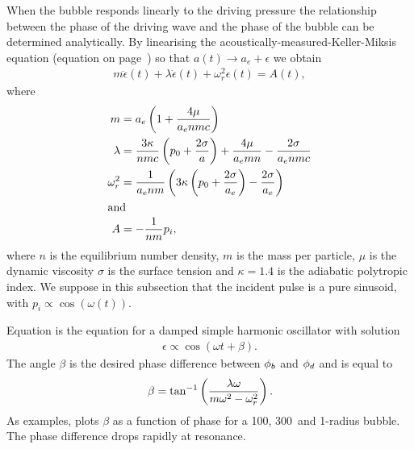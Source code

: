 When the bubble responds linearly to the driving pressure 
the relationship between the phase of the driving wave and the phase of the bubble can be determined analytically.
By linearising the acoustically-measured-Keller-Miksis equation (equation  on page~\pageref{eqn:RKM})
so that $a(t) \rightarrow a_e + \epsilon$
we obtain
\begin{align}
 m \ddot \epsilon(t) + \lambda \dot \epsilon(t) + \omega_r^2 \epsilon(t) = A(t), \label{eqn:SHO}
\end{align}
where 
\begin{align}
  m &= a_e\left( 1+ \frac{4\mu}{a_enmc} \right)\\
  \lambda &= \frac{3\kappa}{nmc}\left( p_0+\frac{2\sigma}{a} \right) + \frac{4\mu}{a_emn} - \frac{2\sigma}{a_e nmc}\\
  \omega_r^2 &= \frac{1}{a_enm}\left( 3\kappa \left( p_0 +\frac{2\sigma}{a_e} \right) - \frac{2\sigma}{a_e} \right)\label{eqn:omegar}\\
\intertext{and}
  A &=- \frac{1}{nm}{p_i},
\end{align}
where $n$ is the equilibrium number density, $m$ is the mass per particle, $\mu$ is the dynamic viscosity $\sigma$ is the surface tension and 
 $\kappa= 1.4$ is the adiabatic polytropic index.
We suppose in this subsection that the incident pulse is a pure sinusoid, with  $p_i \propto \cos(\omega(t))$.

Equation  is the equation for a damped simple harmonic oscillator with solution
\begin{align}
\epsilon \propto \cos(\omega t + \beta). \label{eqn:SHO_soln}
\end{align}
The angle $\beta$ is the desired phase difference between ${\phi_b}$ and ${\phi_d}$ and is equal to 
\begin{align}
\beta = \tan^{-1}\left( \frac{\lambda \omega}{m \omega^2-\omega_r^2} \right).
\end{align}
As examples,  plots $\beta$ as a function of phase for a \unit{100}\nano\metre, \unit{300}\nano\metre\  and \unit{1}\micro\metre-radius bubble.
The phase difference drops rapidly at resonance.





